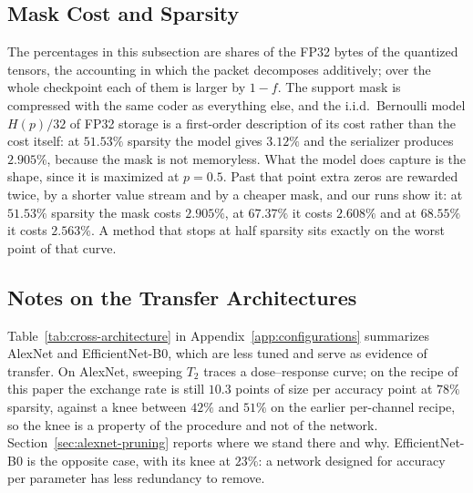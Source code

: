 \documentclass{article}
\begin{document}
\subsection{Mask Cost and Sparsity}
\label{app:mask-cost}

The percentages in this subsection are shares of the FP32 bytes of the quantized
tensors, the accounting in which the packet decomposes additively; over the whole
checkpoint each of them is larger by $1-f$.
The support mask is compressed with the same coder as everything else, and the
i.i.d.\ Bernoulli model $H(p)/32$ of FP32 storage is a first-order description of
its cost rather than the cost itself: at $51.53\%$ sparsity the model gives
$3.12\%$ and the serializer produces $2.905\%$, because the mask is not
memoryless. What the model does capture is the shape, since it is maximized at
$p=0.5$. Past that point extra zeros are rewarded twice, by a shorter value
stream and by a cheaper mask, and our runs show it: at $51.53\%$ sparsity the
mask costs $2.905\%$, at $67.37\%$ it costs $2.608\%$ and at $68.55\%$ it costs
$2.563\%$. A method that stops at half sparsity sits exactly on the worst point
of that curve.

\subsection{Notes on the Transfer Architectures}

Table~\ref{tab:cross-architecture} in Appendix~\ref{app:configurations}
summarizes AlexNet and EfficientNet-B0, which are less tuned and serve as
evidence of transfer. On AlexNet, sweeping $T_2$ traces a
dose--response curve; on the recipe of this paper the exchange rate is still
$10.3$ points of size per accuracy point at $78\%$ sparsity, against a knee
between $42\%$ and $51\%$ on the earlier per-channel recipe, so the knee is a
property of the procedure and not of the network.
Section~\ref{sec:alexnet-pruning} reports where we stand there and why.
EfficientNet-B0 is the opposite case, with its knee at $23\%$: a network designed
for accuracy per parameter has less redundancy to remove.
\end{document}
